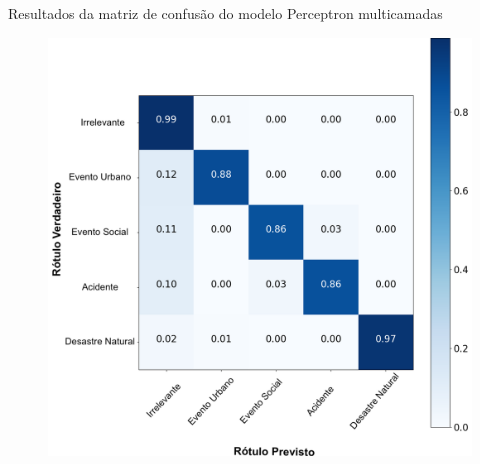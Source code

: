 \documentclass{beamer}
\begin{document}
\begin{frame}{Resultados da matriz de confusão do modelo Perceptron multicamadas}
\begin{figure}[!htb]%
	\centering
		\includegraphics[width=0.7\linewidth]{confusion_matrix_mlp_pt.png}
	\label{fig:pizza_bus}
\end{figure}
\end{frame}
\end{document}
